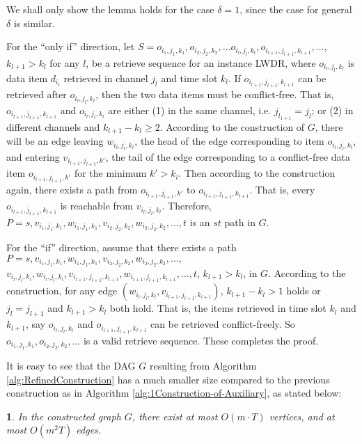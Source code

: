 \documentclass[11pt,english,onecolumn,draftcls]{IEEEtran}
\theoremstyle{plain}
\theoremstyle{plain}
\theoremstyle{plain}
\newtheorem{lem}[thm]{\protect\lemmaname}
\theoremstyle{plain}
\providecommand{\lemmaname}{Lemma}
\begin{document}
\begin{IEEEproof}
We shall only show the lemma holds for the case $\delta=1$, since
the case for general $\delta$ is similar.

For the ``only if'' direction, let $S=o_{i_{1},j_{1},k_{1}},o_{i_{2},j_{2},k_{2}},\dots o_{i_{l},j_{l},k_{l}},o_{i_{l+1},j_{l+1},k_{l+1}},\dots$,
$k_{l+1}>k_{l}$ for any $l$, be a retrieve sequence for an instance
LWDR, where $o_{i_{l},j_{l},k_{l}}$ is data item $d_{i_{l}}$ retrieved
in channel $j_{l}$ and time slot $k_{l}$. If $o_{i_{l+1},j_{l+1},k_{l+1}}$
can be retrieved after $o_{i_{l},j_{l},k_{l}}$, then the two data
items must be conflict-free. That is, $o_{i_{l+1},j_{l+1},k_{l+1}}$
and $o_{i_{l},j_{l},k_{l}}$ are either (1) in the same channel, i.e.
$j_{l_{1+1}}=j_{l}$; or (2) in different channels and $k_{l+1}-k_{l}\geq2$.
According to the construction of $G$, there will be an edge leaving
$w_{i_{l},j_{l},k_{l}}$, the head of the edge corresponding to item
$o_{i_{l},j_{l},k_{l}}$, and entering $v{}_{i_{l+1},j_{l+1},k'}$,
the tail of the edge corresponding to a conflict-free data item $o_{i_{l+1},j_{l+1},k'}$
for the minimum $k'>k_{l}$. Then according to the construction again,
there exists a path from $o_{i_{l+1},j_{l+1},k'}$ to $o_{i_{l+1},j_{l+1},k_{l+1}}$.
That is, every $o_{i_{l+1},j_{l+1},k_{l+1}}$ is reachable from $v_{i_{l},j_{l},k_{l}}$.
Therefore, $P=s,v_{i_{1},j_{1},k_{1}},w_{i_{1},j_{1},k_{1}},v_{i_{2},j_{2},k_{2}},w{}_{i_{2},j_{2},k_{2}},\dots,t$
is an $st$ path in $G$.

For the ``if'' direction, assume that there exists a path $P=s,v_{i_{1},j_{1},k_{1}},w_{i_{1},j_{1},k_{1}},v_{i_{2},j_{2},k_{2}},w_{i_{2},j_{2},k_{2}},\dots,$
$v_{i_{l},j_{l},k_{l}},w_{i_{l},j_{l},k_{l}},v_{i_{l+1},j_{l+1},k_{l+1}},w_{i_{l+1},j_{l+1},k_{l+1}},\dots,t$,
$k_{l+1}>k_{l}$, in $G$. According to the construction, for any
edge $(w_{i_{l},j_{l},k_{l}},v{}_{i_{l+1},j_{l+1},k_{l+1}})$, $k_{l+1}-k_{l}>1$
holds or $j_{l}=j_{l+1}$ and $k_{l+1}>k_{l}$ both hold. That is,
the items retrieved in time slot $k_{l}$ and $k_{l+1}$, say $o_{i_{l},j_{l},k_{l}}$
and $o_{i_{l+1},j_{l+1},k_{l+1}}$ can be retrieved conflict-freely.
So $o_{i_{1},j_{1},k_{1}},o_{i_{2},j_{2},k_{2}},\dots$ is a valid
retrieve sequence. These completes the proof.
\end{IEEEproof}
It is easy to see that the DAG $G$ resulting from Algorithm \ref{alg:RefinedConstruction}
has a much smaller size compared to the previous construction as in
Algorithm \ref{alg:1Construction-of-Auxiliary}, as stated below:
\begin{lem}
\label{lem:sizeofrefined}In the constructed graph $G$, there exist
at most $O(m\cdot T)$ vertices, and at most $O(m^{2}T)$ edges.\end{lem}
\end{document}
